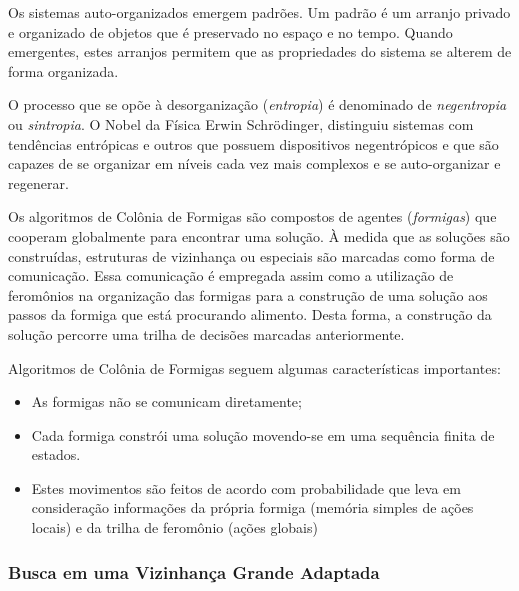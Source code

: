 Os sistemas auto-organizados emergem padrões. Um padrão é um arranjo privado e organizado de objetos que é preservado no espaço e no tempo. Quando emergentes, estes arranjos permitem que as propriedades do sistema se alterem de forma organizada.

O processo que se opõe à desorganização (\emph{entropia}) é denominado de \emph{negentropia} ou \emph{sintropia}. O Nobel da Física Erwin Schrödinger, distinguiu sistemas com tendências entrópicas e outros que possuem dispositivos negentrópicos e que são capazes de se organizar em níveis cada vez mais complexos e se auto-organizar e regenerar. 

Os algoritmos de Colônia de Formigas são compostos de agentes (\emph{formigas}) que cooperam globalmente para encontrar uma solução. À medida que as soluções são construídas, estruturas de vizinhança ou especiais são marcadas como forma de comunicação. Essa comunicação é empregada assim como a utilização de feromônios na organização das formigas para a construção de uma solução aos passos da formiga que está procurando alimento. Desta forma, a construção da solução percorre uma trilha de decisões marcadas anteriormente.

Algoritmos de Colônia de Formigas seguem algumas características importantes:
\begin{itemize}
    \item As formigas não se comunicam diretamente;
    \item Cada formiga constrói uma solução movendo-se em uma sequência finita de estados.
    \item Estes movimentos são feitos de acordo com probabilidade que leva em consideração informações da própria formiga (memória simples de ações locais) e da trilha de feromônio (ações globais)
\end{itemize}



\subsubsection{Busca em uma Vizinhança Grande Adaptada}


